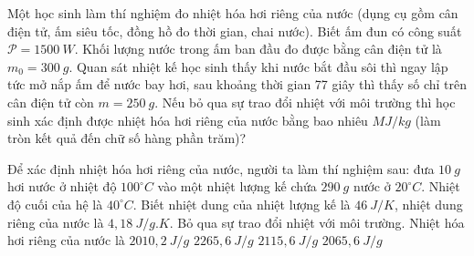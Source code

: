 \begin{ex} 
Một học sinh làm thí nghiệm đo nhiệt hóa hơi riêng của nước (dụng cụ gồm cân điện tử, ấm siêu tốc, đồng hồ đo thời gian, chai nước). Biết ấm đun có công suất $\mathcal{P}=1500 \ W$. Khối lượng nước trong ấm ban đầu đo được bằng cân điện tử là $m_0=300 \ g$. Quan sát nhiệt kế học sinh thấy khi nước bắt đầu sôi thì ngay lập tức mở nắp ấm để nước bay hơi, sau khoảng thời gian 77 giây thì thấy số chỉ trên cân điện tử còn $m=250 \ g$. Nếu bỏ qua sự trao đổi nhiệt với môi trường thì học sinh xác định được nhiệt hóa hơi riêng của nước bằng bao nhiêu $MJ / kg$ (làm tròn kết quả đến chữ số hàng phần trăm)?
\end{ex}
\begin{ex} 
	Để xác định nhiệt hóa hơi riêng của nước, người ta làm thí nghiệm sau: đưa $10 \ g$ hơi nước ở nhiệt độ $100^\circ C$ vào một nhiệt lượng kế chứa $290 \ g$ nước ở $20^\circ C$. Nhiệt độ cuối của hệ là $40^\circ C$. Biết nhiệt dung của nhiệt lượng kế là $46 \ J / K$, nhiệt dung riêng của nước là $4,18 \ J /g.K$. Bỏ qua sự trao đổi nhiệt với môi trường. Nhiệt hóa hơi riêng của nước là
	\choice
	{$2010,2 \ J /g$}
	{\True $2265,6 \ J /g$}
	{$2115,6 \ J /g$}
	{$2065,6 \ J /g$}
\end{ex}

